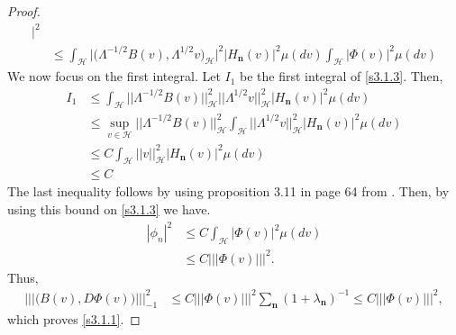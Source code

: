 \documentclass[review, onefignum, onetabnum]{siamart171218}
\begin{document}
\begin{proof}
\begin{equation}
\begin{aligned}
            \Bigg|^2
            \\
            &\le
            \int_{\mathcal{H}}
            \big|
                \big(
                    \Lambda^{-1/2}B(v),\Lambda^{1/2} v
                \big)_{\mathcal{H}}
            \big|^2
            \big|
                H_{\mathbf{n}}(v)
            \big|^2 \mu(dv)
            \int_{\mathcal{H}}
            \big|
                \Phi(v)
            \big|^2  \mu(dv)
     \end{aligned}
\end{equation}
We now focus on the first integral. Let $I_1$ be the first integral of
\eqref{s3.1.3}. Then,
\begin{align*}
I_1&\le \int_{\mathcal{H}}\big|\big|\Lambda^{-1/2}B(v)
\big|\big|_{\mathcal{H}}^2
\big|\big|\Lambda^{1/2}v \big|\big|_{\mathcal{H}}^2
\big|H_{\mathbf{n}}(v)\big|^2 \mu(dv)\\
& \le \sup_{v\in\mathcal{H}} \big|\big|\Lambda^{-1/2}B(v)
\big|\big|_{\mathcal{H}}^2
\int_{\mathcal{H}} \big|\big|\Lambda^{1/2}v \big|\big|_{\mathcal{H}}^2
\big|H_{\mathbf{n}}(v)\big|^2 \mu(dv)\\
& \le C \int_{\mathcal{H}} \big|\big|v \big|\big|_{\mathcal{H}}^2
\big|H_{\mathbf{n}}(v)\big|^2 \mu(dv)\\
& \le C
\end{align*}
%
The last inequality follows by using proposition 3.11 in page 64 from
\cite{da1}. Then, by using this bound on \eqref{s3.1.3} we have.
\begin{align*}
    | \phi_n |^2 &\le C \int_{\mathcal{H}}\big|  \Phi(v)\big|^2  \mu(dv)\\
    &\le C |||\Phi(v) |||^2  .
\end{align*}
Thus,
\begin{align*}
    ||| \big(B(v),D\Phi(v) \big) |||_{-1}^2 
        &\le C |||\Phi(v) |||^2
        \sum_{\mathbf{n}} (1+\lambda_{\mathbf{n}})^{-1}  
        \le C |||\Phi(v) |||^2 ,
\end{align*}
 which proves \eqref{s3.1.1}.


\end{proof}
\end{document}
